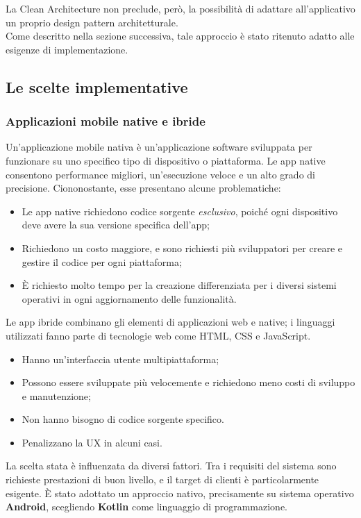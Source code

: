 \documentclass{natourDoc}
\begin{document}
La Clean Architecture non preclude, però, la possibilità di adattare all'applicativo un proprio design pattern architetturale. \\
Come descritto nella sezione successiva, tale approccio è stato ritenuto adatto alle esigenze di implementazione.

\newpage

\subsection{Le scelte implementative}
\subsubsection{Applicazioni mobile native e ibride}
Un’applicazione mobile nativa è un’applicazione software sviluppata per funzionare su uno specifico tipo di dispositivo o piattaforma.
Le app native consentono performance migliori, un’esecuzione veloce e un alto grado di precisione. Ciononostante, esse presentano alcune problematiche:
\begin{itemize}
	\item Le app native richiedono codice sorgente \textit{esclusivo}, poiché ogni dispositivo deve avere la sua versione specifica dell’app;
	\item Richiedono un costo maggiore, e sono richiesti più sviluppatori per creare e gestire il codice per ogni piattaforma;
	\item È richiesto molto tempo per la creazione differenziata per i diversi sistemi operativi in ogni aggiornamento delle funzionalità.
\end{itemize}

Le app ibride combinano gli elementi di applicazioni web e native; i linguaggi utilizzati fanno parte di tecnologie web come HTML, CSS e JavaScript.
\begin{itemize}
	\item Hanno un’interfaccia utente multipiattaforma;
	\item Possono essere sviluppate più velocemente e richiedono meno costi di sviluppo e manutenzione;
	\item Non hanno bisogno di codice sorgente specifico.
	\item Penalizzano la UX in alcuni casi.
\end{itemize}

La scelta stata è influenzata da diversi fattori. Tra i requisiti del sistema sono richieste prestazioni di buon livello, e il target
di clienti è particolarmente esigente.
È stato adottato un approccio nativo, precisamente su sistema operativo \textbf{Android}, scegliendo \textbf{Kotlin} come linguaggio di programmazione.
\end{document}
